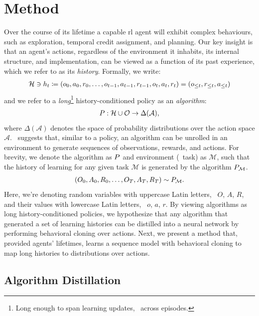 
\section{Method}
\label{sec:method}

 Over the course of its lifetime a capable \acrfull{rl} agent will exhibit complex behaviours, such as exploration, temporal credit assignment, and planning. Our key insight is that an agent's actions, regardless of the environment it inhabits, its internal structure, and implementation, can be viewed as a function of its past experience, which we refer to as its \emph{history}. Formally, we write:
%
\begin{align}
  \mathcal{H} \ni h_{t} \coloneqq \left( o_{0}, a_{0}, r_{0}, \ldots, o_{t-1}, a_{t-1}, r_{t-1}, o_{t}, a_{t}, r_{t} \right) = \left( o_{\leq t}, r_{\leq t}, a_{\leq t}  \right)
\end{align}
%
and we refer to a \emph{long}\footnote{%
  Long enough to span learning updates, \eg~across episodes.
  }
history-conditioned policy as an \emph{algorithm}:
\begin{align}
  P: \mathcal{H}  \cup \mathcal{O} \rightarrow \Delta(\mathcal{A}),
\label{eq:algo-signature}
\end{align}
%
where $\Delta(\mathcal{A})$ denotes the space of probability distributions over the action space $\mathcal{A}$.
~suggests that, similar to a policy, an algorithm can be unrolled in an environment to generate sequences of observations, rewards, and actions.
For brevity, we denote the algorithm as $P$ and environment (\ie~task) as $\mathcal{M}$, such that the history of learning for any given task $\mathcal{M}$ is generated by the algorithm $P_{\mathcal{M}}$.
%
\begin{align}
  \left( O_{0}, A_{0}, R_{0}, \ldots, O_{T}, A_{T}, R_{T} \right) \sim P_{\mathcal{M}}.
\end{align}
Here, we're denoting random variables with uppercase Latin letters, \eg~$O$, $A$, $R$, and their values with lowercase Latin letters, \eg~$o$, $a$, $r$.
By viewing algorithms as long history-conditioned policies, we hypothesize that any algorithm that generated a set of learning histories can be distilled into a neural network by performing behavioral cloning over actions.
Next, we present a method that, provided agents' lifetimes, learns a sequence model with behavioral cloning to map long histories to distributions over actions.

\subsection{Algorithm Distillation}
\label{subsec:algorithm-distillation}

